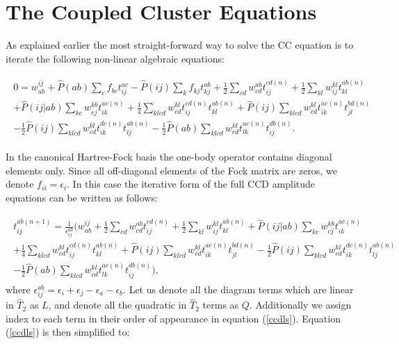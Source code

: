 \documentclass[twoside,english]{uiofysmaster}
\begin{document}
\section{The Coupled Cluster Equations}

As explained earlier the most straight-forward way to solve the CC
equation is to iterate the following non-linear algebraic
equations:

\begin{align}
\begin{split}
0 = w_{ab}^{ij} + \hat{P}(ab)\sum_{c}f_{bc}t_{ij}^{ac} - \hat{P}(ij)\sum_{k}f_{kj} t_{kj}^{ab} + \frac{1}{2}\sum_{cd}w_{cd}^{ab}t_{ij}^{cd(n)} + \frac{1}{2}\sum_{kl}w_{ij}^{kl}t_{kl}^{ab(n)}\\ + \hat{P}(ij|ab)\sum_{kc}w_{cj}^{kb}t_{ik}^{ac(n)}
+ \frac{1}{4}\sum_{klcd}w_{cd}^{kl}t_{ij}^{cd(n)}t_{kl}^{ab(n)} + \hat{P}(ij)\sum_{klcd}w_{cd}^{kl}t_{ik}^{ac(n)}t_{jl}^{bd(n)}\\ - \frac{1}{2}\hat{P}(ij)\sum_{klcd}w_{cd}^{kl}t_{ik}^{dc(n)}t_{lj}^{ab(n)} - \frac{1}{2}\hat{P}(ab)\sum_{klcd}w_{cd}^{kl}t_{lk}^{ac(n)}t_{ij}^{db(n)}.
\end{split}
\end{align}

In the canonical Hartree-Fock basis the one-body operator contains diagonal elements only. Since all off-diagonal elements of the Fock matrix are zeros, we denote $f_{ii} = \epsilon_i$. In this case the iterative form of the full CCD amplitude equations can be written as follows:

\begin{align}\label{ccdls}
\begin{split}
t_{ij}^{ab(n+1)} = \frac{1}{\epsilon_{ij}^{ab}}(w_{ab}^{ij} + \frac{1}{2}\sum_{cd}w_{cd}^{ab}t_{ij}^{cd(n)} + \frac{1}{2}\sum_{kl}w_{ij}^{kl}t_{kl}^{ab(n)} + \hat{P}(ij|ab)\sum_{kc}w_{cj}^{kb}t_{ik}^{ac(n)}\\
+ \frac{1}{4}\sum_{klcd}w_{cd}^{kl}t_{ij}^{cd(n)}t_{kl}^{ab(n)} + \hat{P}(ij)\sum_{klcd}w_{cd}^{kl}t_{ik}^{ac(n)}t_{jl}^{bd(n)} - \frac{1}{2}\hat{P}(ij)\sum_{klcd}w_{cd}^{kl}t_{ik}^{dc(n)}t_{lj}^{ab(n)}\\ - \frac{1}{2}\hat{P}(ab)\sum_{klcd}w_{cd}^{kl}t_{lk}^{ac(n)}t_{ij}^{db(n)}),
\end{split}
\end{align}
where $\epsilon_{ij}^{ab} = \epsilon_i + \epsilon_j - \epsilon_a - \epsilon_b$. Let us denote all the diagram terms which are  linear in $\hat{T}_2$ as $L$, and denote all the quadratic in $\hat{T}_2$ terms as $Q$. Additionally we assign index to each term in their order of appearance in equation (\ref{ccdls}). Equation (\ref{ccdls}) is then simplified to: 
\end{document}
